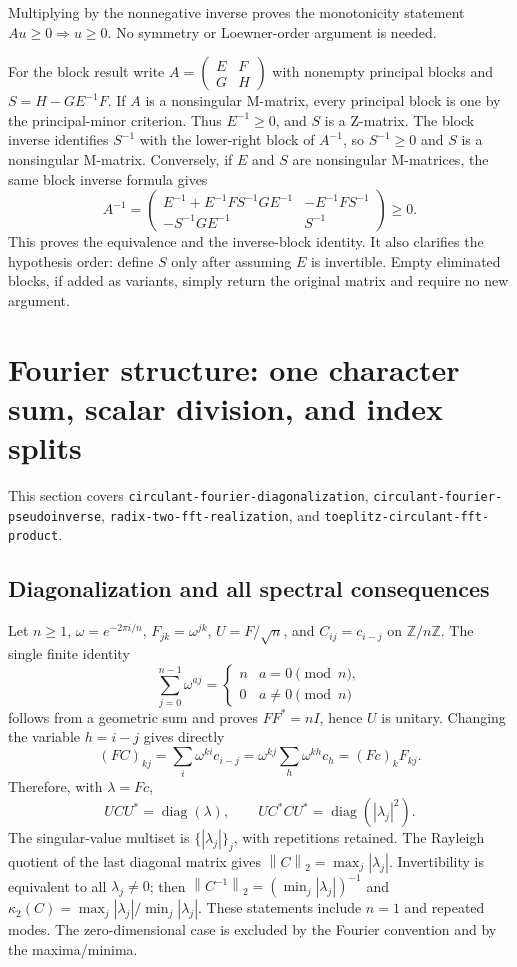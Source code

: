 \documentclass[11pt,a4paper]{article}
\newcommand{\norm}[1]{\left\lVert#1\right\rVert}
\DeclareMathOperator{\diag}{diag}
\DeclareRobustCommand{\code}[1]{{\footnotesize\urlstyle{tt}\nolinkurl{#1}}}
\begin{document}
Multiplying by the nonnegative inverse proves the monotonicity statement
$Au\ge0\Rightarrow u\ge0$. No symmetry or Loewner-order argument is
needed.

For the block result write $A=\left(\begin{smallmatrix}E&F\\G&H\end{smallmatrix}\right)$
with nonempty principal blocks and $S=H-GE^{-1}F$. If $A$ is a nonsingular
M-matrix, every principal block is one by the principal-minor criterion.
Thus $E^{-1}\ge0$, and $S$ is a Z-matrix. The block inverse identifies
$S^{-1}$ with the lower-right block of $A^{-1}$, so $S^{-1}\ge0$ and $S$
is a nonsingular M-matrix. Conversely, if $E$ and $S$ are nonsingular
M-matrices, the same block inverse formula gives
\[
 A^{-1}=\begin{pmatrix}
 E^{-1}+E^{-1}FS^{-1}GE^{-1}&-E^{-1}FS^{-1}\\
 -S^{-1}GE^{-1}&S^{-1}
 \end{pmatrix}\ge0.
\]
This proves the equivalence and the inverse-block identity. It also
clarifies the hypothesis order: define $S$ only after assuming $E$ is
invertible. Empty eliminated blocks, if added as variants, simply return
the original matrix and require no new argument.

\section{Fourier structure: one character sum, scalar division, and index splits}
\label{sec:ns-fourier}

This section covers \code{circulant-fourier-diagonalization},
\code{circulant-fourier-pseudoinverse},
\code{radix-two-fft-realization}, and
\code{toeplitz-circulant-fft-product}.

\subsection{Diagonalization and all spectral consequences}

Let $n\ge1$, $\omega=e^{-2\pi i/n}$,
$F_{jk}=\omega^{jk}$, $U=F/\sqrt n$, and
$C_{ij}=c_{i-j}$ on $\mathbb Z/n\mathbb Z$. The single finite identity
\[
 \sum_{j=0}^{n-1}\omega^{aj}=
 \begin{cases}n&a=0\pmod n,\\0&a\ne0\pmod n\end{cases}
\]
follows from a geometric sum and proves $FF^*=nI$, hence $U$ is unitary.
Changing the variable $h=i-j$ gives directly
\[
 (FC)_{kj}=\sum_i\omega^{ki}c_{i-j}
       =\omega^{kj}\sum_h\omega^{kh}c_h
       =(Fc)_kF_{kj}.
\]
Therefore, with $\lambda=Fc$,
\[
 UCU^*=\diag(\lambda),\qquad
 UC^*CU^*=\diag(|\lambda_j|^2).
\]
The singular-value multiset is $\{ |\lambda_j|\}_j$, with repetitions
retained. The Rayleigh quotient of the last diagonal matrix gives
$\norm C_2=\max_j|\lambda_j|$. Invertibility is equivalent to all
$\lambda_j\ne0$; then
$\norm{C^{-1}}_2=(\min_j|\lambda_j|)^{-1}$ and
$\kappa_2(C)=\max_j|\lambda_j|/\min_j|\lambda_j|$.
These statements include $n=1$ and repeated modes. The zero-dimensional
case is excluded by the Fourier convention and by the maxima/minima.
\end{document}
